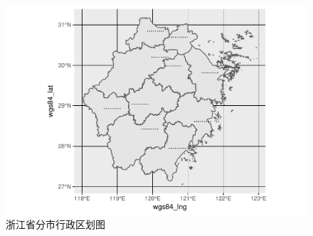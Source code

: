 \documentclass[]{article}
\begin{document}
\begin{figure}

{\centering \includegraphics{利用高德地图API接口生成行政区划图_files/figure-latex/city_map-1} 

}

\caption{浙江省分市行政区划图}\label{fig:city_map}
\end{figure}
\end{document}
